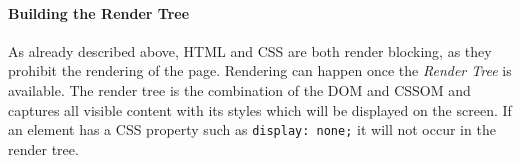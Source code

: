 






















\paragraph{Building the Render Tree}


As already described above, HTML and CSS are both render blocking, as they prohibit the rendering of the page.
Rendering can happen once the \textit{Render Tree} is available.
The render tree is the combination of the DOM and CSSOM and captures all visible content with its styles which will be displayed on the screen.
If an element has a CSS property such as \verb|display: none;| it will not occur in the render tree. %

